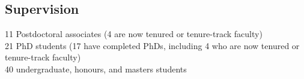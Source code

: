 \documentclass[margin,line]{res}
\begin{document}
\begin{resume}



\section{\sc Supervision}
11 Postdoctoral associates (4 are now tenured or tenure-track faculty)\\
21 PhD students (17 have completed PhDs, including 4 who are now tenured or tenure-track faculty)\\
40 undergraduate, honours, and masters students\\



\end{resume}
\end{document}
